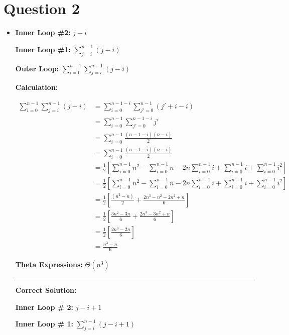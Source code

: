 \documentclass[12pt]{article}
\begin{document}
\section*{Question 2}
\begin{itemize}

    \item

    \textbf{Inner Loop \#2:} $j - i$

    \textbf{Inner Loop \#1:} $\sum\limits_{j=i}^{n - 1} (j - i)$

    \textbf{Outer Loop:} $\sum\limits_{i=0}^{n-1}\sum\limits_{j=i}^{n - 1} (j - i)$

    \textbf{Calculation:}

    \begin{align}
        \sum\limits_{i=0}^{n-1}\sum\limits_{j=i}^{n - 1} (j - i) &= \sum\limits_{i=0}^{n-1-i}\sum\limits_{j'=0}^{n - 1} (j' + i - i)\\
        &= \sum\limits_{i=0}^{n-1}\sum\limits_{j'=0}^{n-1-i} j'\\
        &= \sum\limits_{i=0}^{n-1} \frac{(n-1-i)(n-i)}{2}\\
        &= \sum\limits_{i=0}^{n-1} \frac{(n-1-i)(n-i)}{2}\\
        &= \frac{1}{2} \left[ \sum\limits_{i=0}^{n-1} n^2 - \sum\limits_{i=0}^{n-1} n - 2n \sum\limits_{i=0}^{n-1} i + \sum\limits_{i=0}^{n-1} i + \sum\limits_{i=0}^{n-1} i^2 \right]\\
        &= \frac{1}{2} \left[ \sum\limits_{i=0}^{n-1} n^2 - \sum\limits_{i=0}^{n-1} n - 2n \sum\limits_{i=0}^{n-1} i + \sum\limits_{i=0}^{n-1} i + \sum\limits_{i=0}^{n-1} i^2 \right]\\
        &= \frac{1}{2} \left[ \frac{(n^2 - n)}{2} + \frac{2n^3 - n^2 - 2n^2 + n}{6} \right]\\
        &= \frac{1}{2} \left[ \frac{3n^2 - 3n}{6} + \frac{2n^3 - 3n^2 + n}{6} \right]\\
        &= \frac{1}{2} \left[ \frac{2n^3 - 2n}{6} \right]\\
        &= \frac{n^3 - n}{6}
    \end{align}

    \textbf{Theta Expressions:} $\Theta (n^3)$

    \noindent\rule{\textwidth}{1pt}

    \textbf{Correct Solution:}

    \bigskip

    \textbf{Inner Loop \# 2:} $j - i + 1$

    \textbf{Inner Loop \# 1:} $\sum\limits_{j = i}^{n-1} (j - i + 1)$


\end{itemize}
\end{document}
